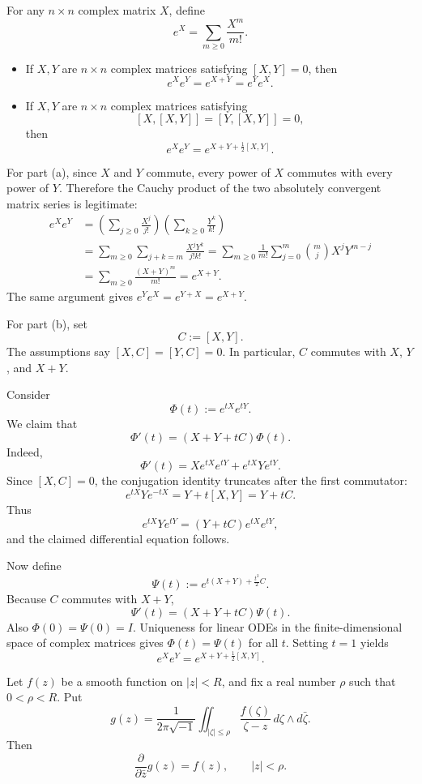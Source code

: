 \begin{exercise}
\label{analysis:2026:2}
For any $n\times n$ complex matrix $X$, define
\[
e^X=\sum_{m\geq 0}\frac{X^m}{m!}.
\]
\begin{itemize}
\item[(a)] If $X,Y$ are $n\times n$ complex matrices satisfying $[X,Y]=0$, then
\[
e^Xe^Y=e^{X+Y}=e^Ye^X.
\]
\item[(b)] If $X,Y$ are $n\times n$ complex matrices satisfying
\[
[X,[X,Y]]=[Y,[X,Y]]=0,
\]
then
\[
e^Xe^Y=e^{X+Y+\frac{1}{2}[X,Y]}.
\]
\end{itemize}
\end{exercise}

\begin{solution}
For part (a), since $X$ and $Y$ commute, every power of $X$ commutes with every power of $Y$.  Therefore the Cauchy product of the two absolutely convergent matrix series is legitimate:
\[
\begin{aligned}
e^Xe^Y
&=\left(\sum_{j\geq 0}\frac{X^j}{j!}\right)
  \left(\sum_{k\geq 0}\frac{Y^k}{k!}\right) \\
&=\sum_{m\geq 0}\sum_{j+k=m}\frac{X^jY^k}{j!k!}
=\sum_{m\geq 0}\frac{1}{m!}\sum_{j=0}^m\binom{m}{j}X^jY^{m-j} \\
&=\sum_{m\geq 0}\frac{(X+Y)^m}{m!}
=e^{X+Y}.
\end{aligned}
\]
The same argument gives $e^Ye^X=e^{Y+X}=e^{X+Y}$.

For part (b), set
\[
C:=[X,Y].
\]
The assumptions say $[X,C]=[Y,C]=0$.  In particular, $C$ commutes with $X$, $Y$, and $X+Y$.

Consider
\[
\Phi(t):=e^{tX}e^{tY}.
\]
We claim that
\[
\Phi'(t)=(X+Y+tC)\Phi(t).
\]
Indeed,
\[
\Phi'(t)=Xe^{tX}e^{tY}+e^{tX}Ye^{tY}.
\]
Since $[X,C]=0$, the conjugation identity truncates after the first commutator:
\[
e^{tX}Ye^{-tX}=Y+t[X,Y]=Y+tC.
\]
Thus
\[
e^{tX}Ye^{tY}=(Y+tC)e^{tX}e^{tY},
\]
and the claimed differential equation follows.

Now define
\[
\Psi(t):=e^{t(X+Y)+\frac{t^2}{2}C}.
\]
Because $C$ commutes with $X+Y$,
\[
\Psi'(t)=(X+Y+tC)\Psi(t).
\]
Also $\Phi(0)=\Psi(0)=I$.  Uniqueness for linear ODEs in the finite-dimensional space of complex matrices gives $\Phi(t)=\Psi(t)$ for all $t$.  Setting $t=1$ yields
\[
e^Xe^Y=e^{X+Y+\frac12[X,Y]}.
\]
\end{solution}

\begin{exercise}
\label{analysis:2026:3}
Let $f(z)$ be a smooth function on $|z|<R$, and fix a real number $\rho$ such that $0<\rho<R$.  Put
\[
g(z)=\frac{1}{2\pi\sqrt{-1}}\iint_{|\zeta|\leq \rho}
\frac{f(\zeta)}{\zeta-z}\,d\zeta\wedge d\bar{\zeta}.
\]
Then
\[
\frac{\partial}{\partial\bar z}g(z)=f(z),\qquad |z|<\rho.
\]
\end{exercise}


